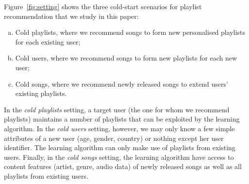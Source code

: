 Figure~\ref{fig:setting} shows the three cold-start scenarios for playlist recommendation 
that we study in this paper:
\begin{enumerate}[(a)]
\item Cold playlists, where we recommend songs to form new personalised playlists for each existing user;
%
\item Cold users, where we recommend songs to form new playlists for each new user;
%
\item Cold songs, where we recommend newly released songs to extend users' existing playlists.
\end{enumerate}
In the \emph{cold playlists} setting, a target user (\ie the one for whom we recommend playlists)
maintains a number of playlists that can be exploited by the learning algorithm.
In the \emph{cold users} setting, however, we may only know a few simple attributes of a new user
(\eg age, gender, country) or nothing except her user identifier. 
The learning algorithm can only make use of playlists from existing users.
Finally, in the \emph{cold songs} setting, the learning algorithm have access to 
content features (\eg artist, genre, audio data) 
of newly released songs as well as all playlists from existing users.

